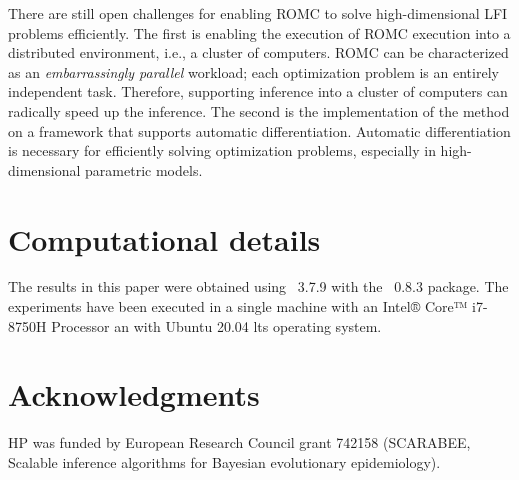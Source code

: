 \documentclass[article]{jss}
\begin{document}
There are still open challenges for enabling ROMC to solve
high-dimensional LFI problems efficiently. The first is enabling the
execution of ROMC execution into a distributed environment, i.e., a
cluster of computers. ROMC can be characterized as an
\textit{embarrassingly parallel} workload; each optimization problem
is an entirely independent task. Therefore, supporting inference into
a cluster of computers can radically speed up the inference. The
second is the implementation of the method on a framework that supports
automatic differentiation. Automatic differentiation is necessary for
efficiently solving optimization problems, especially in
high-dimensional parametric models.



\section*{Computational details}

The results in this paper were obtained using ~3.7.9
with the ~0.8.3 package. The experiments have been executed
in a single machine with an Intel® Core™ i7-8750H Processor an with
Ubuntu 20.04 lts operating system.

\section*{Acknowledgments}

HP was funded by European Research Council grant 742158 (SCARABEE,
Scalable inference algorithms for Bayesian evolutionary epidemiology).

\clearpage


\end{document}
